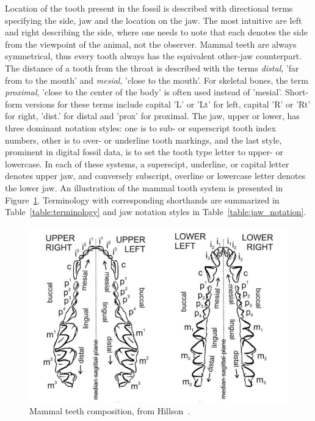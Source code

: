 \documentclass[english,twoside,openright]{UH_DS_MSc}
\begin{document}
Location of the tooth present in the fossil is described with directional terms specifying the side, jaw and the location on the jaw.
The most
intuitive are left and right describing the side, where one needs to note that each denotes the side from the viewpoint of the 
animal, not the observer. Mammal teeth are always symmetrical, thus every tooth always has the 
equivalent other-jaw counterpart. The distance of a tooth from the throat 
is described with the terms \textit{distal}, 'far from to the mouth' and \textit{mesial}, 'close to the mouth'. For skeletal bones, the term \textit{proximal}, 
'close to the center of the body' is often used instead of 'mesial'.
Short-form versions for these terms include capital 'L' or 'Lt' for left, capital 'R' or 'Rt' for right, 'dist.' 
for distal and 'prox' for proximal.
The jaw, upper or lower, has three dominant notation styles: one is to sub- or superscript tooth index numbers, other is to 
over- or underline tooth markings, and the last style, prominent in digital fossil data, is to set the tooth type letter to upper- or lowercase.
In each of these systems, a superscipt, underline, or capital letter denotes upper jaw, and conversely subscript, overline or lowercase letter denotes the lower jaw.
An illustration of the mammal tooth system is presented in Figure~\ref{image:mammal_teeth}. Terminology with corresponding shorthands are summarized in Table~\ref{table:terminology} and jaw notation styles in Table~\ref{table:jaw_notation}.

\begin{figure}[h]
    \centering
    \includegraphics*[scale=0.43]{images/teeth_img_hillson_book.png}
    \caption{Mammal teeth composition, from Hillson~\cite{Hillson_2005}.}
    \label{image:mammal_teeth}
\end{figure}
\end{document}
